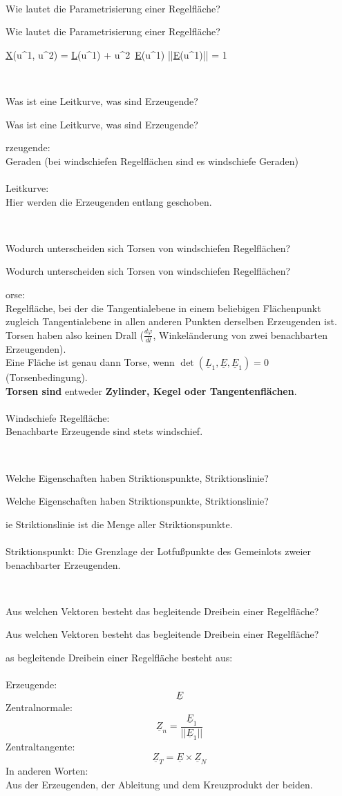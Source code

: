 \documentclass[DIV=1]{scrartcl}
\newcommand{\frage}[3][10]{
    \newpage
    \ 
    \vspace{#1 em}
    \begin{framed}
        #2
    \end{framed}
    \newpage
    \begin{framed}
        #2
    \end{framed}
    \vspace{2 em}
}
\begin{document}



\frage{Wie lautet die Parametrisierung einer Regelfläche?}

\[
    \underline{X}(u^1, u^2) = \underline{L}(u^1) + u^2\, \underline{E}(u^1)
    \quad \text{mit} \quad ||\underline{E}(u^1)|| = 1
\]



\frage{Was ist eine Leitkurve, was sind Erzeugende?}

Erzeugende:\\
Geraden (bei windschiefen Regelflächen sind es windschiefe Geraden)\\
\\
Leitkurve:\\
Hier werden die Erzeugenden entlang geschoben.




\frage{Wodurch unterscheiden sich Torsen von windschiefen Regelflächen?}

Torse:\\
Regelfläche, bei der die Tangentialebene in einem beliebigen Flächenpunkt zugleich Tangentialebene in allen anderen Punkten derselben Erzeugenden ist. Torsen haben also keinen Drall ($\frac{d\varphi}{dl}$, Winkeländerung von zwei benachbarten Erzeugenden).\\
Eine Fläche ist genau dann Torse, wenn $\det(\underline{L}_1, \underline{E}, \underline{E}_1) = 0$ (Torsenbedingung).\\
\textbf{Torsen sind} entweder \textbf{Zylinder, Kegel oder Tangentenflächen}.\\
\\
Windschiefe Regelfläche:\\
Benachbarte Erzeugende sind stets windschief.




\frage{Welche Eigenschaften haben Striktionspunkte, Striktionslinie?}

Die Striktionslinie ist die Menge aller Striktionspunkte.\\
\\
Striktionspunkt: Die Grenzlage der Lotfußpunkte des Gemeinlots zweier benachbarter Erzeugenden.



\frage{Aus welchen Vektoren besteht das begleitende Dreibein einer Regelfläche?}

Das begleitende Dreibein einer Regelfläche besteht aus:\\
\\
Erzeugende:
\[
    \underline{E}
\]
Zentralnormale:
\[
    \underline{Z}_n = \frac{\underline{E}_1}{||\underline{E}_1||}
\]
Zentraltangente:
\[
    \underline{Z}_T = \underline{E} \times \underline{Z}_N
\]
In anderen Worten:\\
Aus der Erzeugenden, der Ableitung und dem Kreuzprodukt der beiden.




\end{document}
